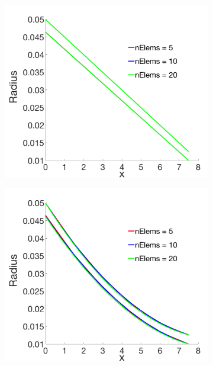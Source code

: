 \documentclass[a4paper]{article}
\begin{document}
\begin{figure} [H]
  \begin{subfigure}{0.51\textwidth}
    \centering
    \includegraphics[width=1.0\linewidth]{p1.png}
    \label{fig:linear}
  \end{subfigure}
  \begin{subfigure}{0.51\textwidth}
    \centering
    \includegraphics[width=1.0\linewidth]{p2.png}
    \label{fig:quadratic}
  \end{subfigure}\\[4ex]

\end{figure}
\end{document}
